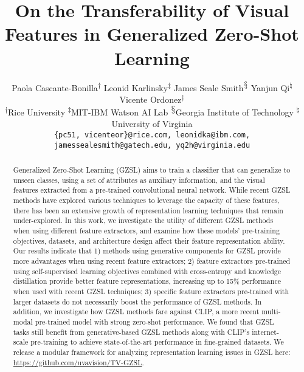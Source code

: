 \documentclass[10pt,twocolumn,letterpaper]{article}
\begin{document}
\title{On the Transferability of Visual Features in Generalized Zero-Shot Learning}


\author{Paola Cascante-Bonilla\textsuperscript{$\dagger$} \quad Leonid Karlinsky\textsuperscript{$\ddagger$} \quad James Seale Smith\textsuperscript{$\mathsection$} \quad Yanjun Qi\textsuperscript{$\natural$} \quad Vicente Ordonez\textsuperscript{$\dagger$}\\
\textsuperscript{$\dagger$}Rice University \quad \textsuperscript{$\ddagger$}MIT-IBM Watson AI Lab \quad \textsuperscript{$\mathsection$}Georgia Institute of Technology \quad \textsuperscript{$\natural$}University of Virginia\\
{\tt\small \{pc51, vicenteor\}@rice.com, leonidka@ibm.com, jamessealesmith@gatech.edu, yq2h@virginia.edu}
}
\maketitle

\begin{abstract}


Generalized Zero-Shot Learning (GZSL) aims to train a classifier that can generalize to unseen classes, using a set of attributes as auxiliary information, and the visual features extracted from a pre-trained convolutional neural network.
While recent GZSL methods have explored various techniques to leverage the capacity of these features, there has been an extensive growth of representation learning techniques that remain under-explored. 
In this work, we investigate the utility of different GZSL methods when using different feature extractors, and examine how these models' pre-training objectives, datasets, and architecture design affect their feature representation ability.
Our results indicate that 1) methods using generative components for GZSL provide more advantages when using recent feature extractors;
2) feature extractors pre-trained using self-supervised learning objectives combined with cross-entropy and knowledge distillation provide better feature 
representations, increasing up to 15\% performance when used with recent GZSL techniques; 3) specific feature extractors pre-trained with larger datasets do not necessarily boost the performance of GZSL methods. 
In addition, we investigate how GZSL methods fare against CLIP, a more recent multi-modal pre-trained model with strong zero-shot performance. We found that GZSL tasks still benefit from generative-based GZSL methods along with CLIP's internet-scale pre-training to achieve state-of-the-art performance in fine-grained datasets.
We release a modular framework for analyzing representation learning issues in GZSL here: \href{https://github.com/uvavision/TV-GZSL}{https://github.com/uvavision/TV-GZSL}.

\end{abstract}
\end{document}
